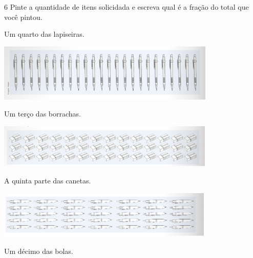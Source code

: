\begin{mdframed}[linewidth=2pt,linecolor=salmao,roundcorner=2pt]
\begin{escolha}
{\num{6} Pinte a quantidade de itens solicidada e escreva qual é a fração do total que você pintou.

\begin{escolha}
\item Um quarto das lapiseiras.

\includegraphics[width=4.09202in,height=1.08343in]{media/image111.png}


\item  Um terço das borrachas.

\includegraphics[width=4.08369in,height=0.81674in]{media/image112.png}


\item A quinta parte das canetas.

\includegraphics[width=4.06702in,height=0.89174in]{media/image113.png}


\item  Um décimo das bolas.


\end{escolha}

}
\end{escolha}
\end{mdframed}
